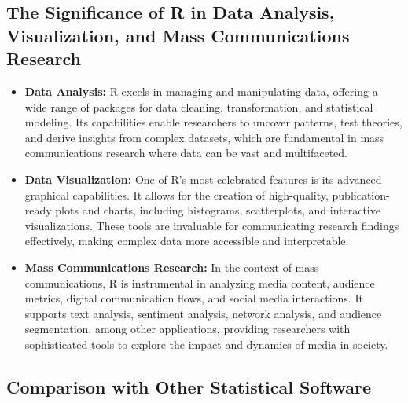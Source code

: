 \documentclass[
]{book}
\begin{document}
\subsection*{The Significance of R in Data Analysis, Visualization, and Mass Communications Research}\label{the-significance-of-r-in-data-analysis-visualization-and-mass-communications-research}

\begin{itemize}
\item
  \textbf{Data Analysis:} R excels in managing and manipulating data, offering a wide range of packages for data cleaning, transformation, and statistical modeling. Its capabilities enable researchers to uncover patterns, test theories, and derive insights from complex datasets, which are fundamental in mass communications research where data can be vast and multifaceted.
\item
  \textbf{Data Visualization:} One of R's most celebrated features is its advanced graphical capabilities. It allows for the creation of high-quality, publication-ready plots and charts, including histograms, scatterplots, and interactive visualizations. These tools are invaluable for communicating research findings effectively, making complex data more accessible and interpretable.
\item
  \textbf{Mass Communications Research:} In the context of mass communications, R is instrumental in analyzing media content, audience metrics, digital communication flows, and social media interactions. It supports text analysis, sentiment analysis, network analysis, and audience segmentation, among other applications, providing researchers with sophisticated tools to explore the impact and dynamics of media in society.
\end{itemize}

\subsection{Comparison with Other Statistical Software}\label{comparison-with-other-statistical-software}
\end{document}
